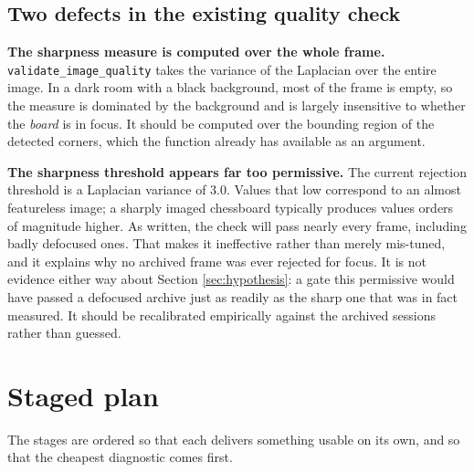 \subsection{Two defects in the existing quality check}

\textbf{The sharpness measure is computed over the whole frame.} \texttt{validate\_image\_quality} takes the variance of the Laplacian over the entire image. In a dark room with a black background, most of the frame is empty, so the measure is dominated by the background and is largely insensitive to whether the \emph{board} is in focus. It should be computed over the bounding region of the detected corners, which the function already has available as an argument.

\textbf{The sharpness threshold appears far too permissive.} The current rejection threshold is a Laplacian variance of 3.0. Values that low correspond to an almost featureless image; a sharply imaged chessboard typically produces values orders of magnitude higher. As written, the check will pass nearly every frame, including badly defocused ones. That makes it ineffective rather than merely mis-tuned, and it explains why no archived frame was ever rejected for focus. It is not evidence either way about Section \ref{sec:hypothesis}: a gate this permissive would have passed a defocused archive just as readily as the sharp one that was in fact measured. It should be recalibrated empirically against the archived sessions rather than guessed.

\section{Staged plan}

The stages are ordered so that each delivers something usable on its own, and so that the cheapest diagnostic comes first.

